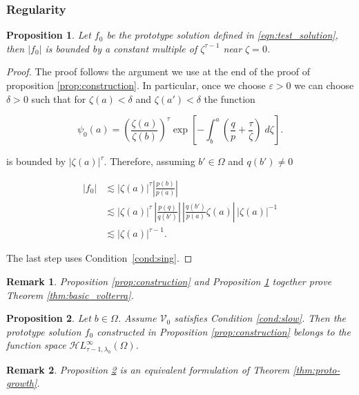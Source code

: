 \documentclass{article}
\theoremstyle{plain}
\newtheorem{prop}{Proposition}
\newtheorem{rmk}{Remark}
\newcommand{\singexp}[2]{\mathcal{H}L^\infty_{#1, #2}}
\newcommand{\hardpart}{\mathcal{V}_0}
\newcommand{\domain}{\Omega}
\begin{document}
\subsubsection{Regularity}\label{sec:asymptotics}

\begin{prop}\label{prop:asymptotic at zero}
    Let $f_0$ be the prototype solution defined in \eqref{eqn:test_solution}, then $|f_0|$ is bounded by a constant multiple of $\zeta^{\tau-1}$ near $\zeta=0$. 
\end{prop}

\begin{proof}
The proof follows the argument we use at the end of the proof of proposition \ref{prop:construction}. In particular, once we choose $\varepsilon>0$ we can choose $\delta>0$ such that for $\zeta(a)<\delta$ and $\zeta(a')<\delta$ the function

\[ \psi_0(a) = \left(\frac{\zeta(a)}{\zeta(b)}\right)^\tau \exp\left[-\int_b^a \left( \frac{q}{p} + \frac{\tau}{\zeta} \right)\;d\zeta\right]. \]

is bounded by $ |\zeta(a)|^\tau$. Therefore, assuming $b'\in\Omega$ and $q(b') \neq 0$

\begin{align*}
|f_0| &  \lesssim |\zeta(a)|^\tau  \left\vert  \frac{p(b)}{p(a)}\right\vert \\
& \lesssim |\zeta(a)|^\tau \, \left\vert\frac{p(q)}{q(b')} \right\vert \, \left\vert \frac{q(b')}{p(a)} \zeta(a)\right\vert \, |\zeta(a)|^{-1} \\
&  \lesssim |\zeta(a)|^{\tau-1}.
\end{align*}

The last step uses Condition~\eqref{cond:sing}. 
\end{proof}
\color{Tomato}
\begin{rmk}
   {\em Proposition \ref{prop:construction}} and {\em Proposition \ref{prop:asymptotic at zero}} together prove {\em Theorem \ref{thm:basic_volterra}}. 
\end{rmk}
\color{black}

\begin{prop}\label{prop:asymptotic at infinity}
    Let $b\in\domain$. Assume $\hardpart$ satisfies {\em Condition} \eqref{cond:slow}. Then the prototype solution $f_0$ constructed in {\em Proposition \ref{prop:construction}} belongs to the function space $\singexp{\tau-1}{\lambda_0}(\domain)$.
\end{prop}
\color{Tomato}
\begin{rmk}
    {\em Proposition \ref{prop:asymptotic at infinity}} is an equivalent formulation of {\em Theorem \ref{thm:proto-growth}}.
\end{rmk}
\color{black}
\end{document}
